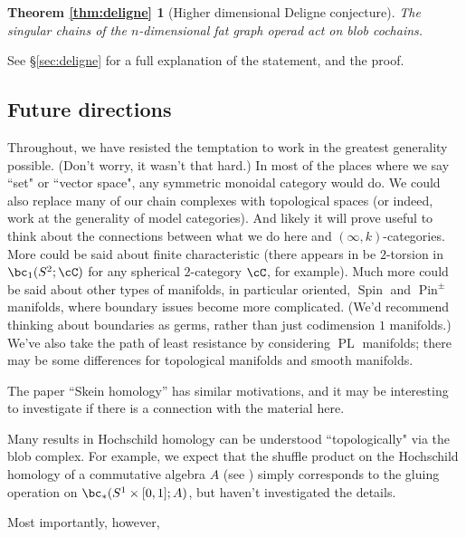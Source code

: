 \newtheorem*{thm:deligne}{Theorem \ref{thm:deligne}}

\begin{thm:deligne}[Higher dimensional Deligne conjecture]
The singular chains of the $n$-dimensional fat graph operad act on blob cochains.
\end{thm:deligne}
See \S \ref{sec:deligne} for a full explanation of the statement, and the proof.




\subsection{Future directions}
\label{sec:future}
Throughout, we have resisted the temptation to work in the greatest generality possible.
(Don't worry, it wasn't that hard.)
In most of the places where we say ``set" or ``vector space", any symmetric monoidal category would do.
We could also replace many of our chain complexes with topological spaces (or indeed, work at the generality of model categories).
And likely it will prove useful to think about the connections between what we do here and $(\infty,k)$-categories.
More could be said about finite characteristic 
(there appears in be $2$-torsion in $\bc_1(S^2; \cC)$ for any spherical $2$-category $\cC$, for example).
Much more could be said about other types of manifolds, in particular oriented, 
$\operatorname{Spin}$ and $\operatorname{Pin}^{\pm}$ manifolds, where boundary issues become more complicated.
(We'd recommend thinking about boundaries as germs, rather than just codimension $1$ manifolds.) 
We've also take the path of least resistance by considering $\operatorname{PL}$ manifolds; 
there may be some differences for topological manifolds and smooth manifolds.

The paper ``Skein homology'' \cite{MR1624157} has similar motivations, and it may be 
interesting to investigate if there is a connection with the material here.

Many results in Hochschild homology can be understood ``topologically" via the blob complex.
For example, we expect that the shuffle product on the Hochschild homology of a commutative algebra $A$ 
(see \cite[\S 4.2]{MR1600246}) simply corresponds to the gluing operation on $\bc_*(S^1 \times [0,1]; A)$, 
but haven't investigated the details.

Most importantly, however,    


